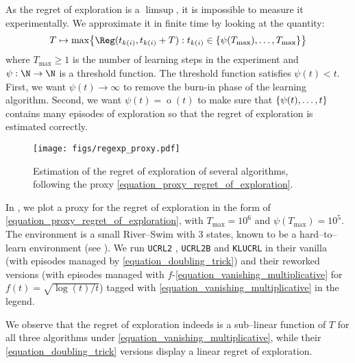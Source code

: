 \documentclass[preprint,cleveref,12pt]{colt2025}
\DeclarePairedDelimiter{\braces}{\{}{\}}	%
\DeclareMathOperator*{\oh}{\mathrm{o}}
\begin{document}
    As the regret of exploration is a $\limsup$, it is impossible to measure it experimentally. 
    We approximate it in finite time by looking at the quantity:
    \begin{equation}
    \label{equation_proxy_regret_of_exploration}
        T \mapsto 
        \max \braces*{
            \Reg(t_{k(i)}, t_{k(i)} + T)
            :
            t_{k(i)} \in \braces{\psi(T_\text{max}), \ldots, T_\text{max}}
        }
    \end{equation}
    where $T_\text{max} \ge 1$ is the number of learning steps in the experiment and $\psi : \N \to \N$ is a threshold function. 
    The threshold function satisfies $\psi(t) < t$. 
    First, we want $\psi(t) \to \infty$ to remove the burn-in phase of the learning algorithm.
    Second, we want $\psi(t) = \oh(t)$ to make sure that $\braces{\psi(t), \ldots, t}$ contains many episodes of exploration so that the regret of exploration is estimated correctly. 

    \begin{figure}[h]
        \centering
        \texttt{[image: figs/regexp\_proxy.pdf]}
        \caption{
        \label{figure_proxy_regret_of_exploration}
            Estimation of the regret of exploration of several algorithms, following the proxy \eqref{equation_proxy_regret_of_exploration}.
        }
    \end{figure}
    
    In , we plot a proxy for the regret of exploration in the form of \eqref{equation_proxy_regret_of_exploration}, with $T_\text{max} = 10^6$ and $\psi(T_\text{max}) = 10^5$.
    The environment is a  small River--Swim with $3$ states, known to be a hard--to--learn environment (see \cite[Figure~4]{bourel_tightening_2020}).
    We run \texttt{UCRL2} \cite{auer_near_optimal_2009}, \texttt{UCRL2B} \cite{fruit_improved_2020} and \texttt{KLUCRL} \cite{filippi_optimism_2010} in their vanilla (with episodes managed by \eqref{equation_doubling_trick}) and their reworked versions (with episodes managed with $f$-\eqref{equation_vanishing_multiplicative} for $f(t) = \sqrt{\log(t)/t}$) tagged with \eqref{equation_vanishing_multiplicative} in the legend.  
    
    We observe that the regret of exploration indeeds is a sub--linear function of $T$ for all three algorithms under \eqref{equation_vanishing_multiplicative}, while their \eqref{equation_doubling_trick} versions display a linear regret of exploration. 
\end{document}
